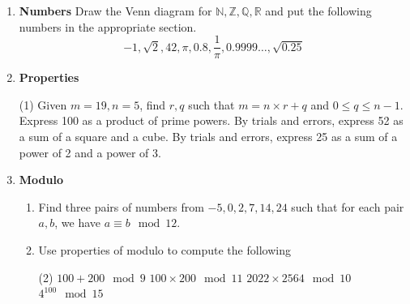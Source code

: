 \begin{enumerate}

\item \textbf{Numbers} Draw the Venn diagram for $\mathbb{N}, \mathbb{Z}, \mathbb{Q}, \mathbb{R}$ and put the following numbers in the appropriate section.
\[ -1, \sqrt{2}, 42, \pi, 0.8, \frac{1}{\pi}, 0.9999\ldots, \sqrt{0.25}\]

\vspace{50pt}

\item \textbf{Properties}

\begin{tasks}[after-skip = 40pt, after-item-skip=40pt](1)
\task Given $m= 19, n =5$, find $r, q$ such that $m = n \times r + q$ and $0 \leq q \leq n-1$.
\task Express 100 as a product of prime powers.
\task By trials and errors, express 52 as a sum of a square and a cube.
\task By trials and errors, express 25 as a sum of a power of 2 and a power of 3.
\end{tasks}

\item \textbf{Modulo}
\begin{enumerate}
\item Find three pairs of numbers from $-5,0,2,7,14,24$ such that for each pair $a,b$, we have $a \equiv b \mod 12$.
\vspace{40pt}
\item Use properties of modulo to compute the following 
\begin{tasks}[after-skip = 60pt, after-item-skip =60pt](2)
\task $100 + 200 \mod 9$
\task $100 \times 200 \mod 11$
\task $2022 \times 2564 \mod 10$
\task $4^{100} \mod 15$
\end{tasks}
\end{enumerate}

\end{enumerate}